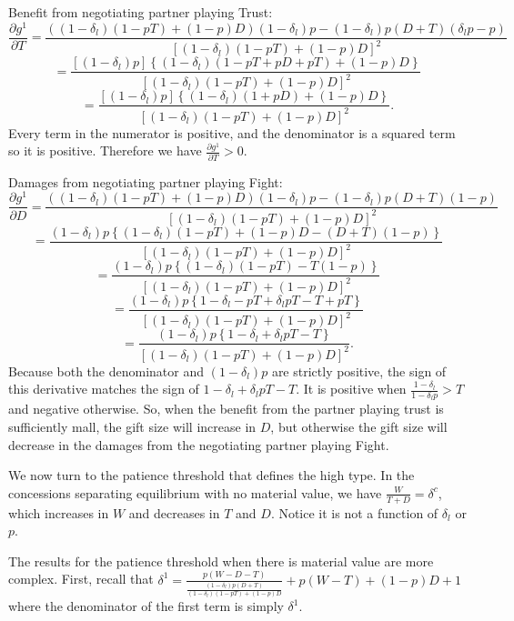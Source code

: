 \documentclass[12pt, letterpaper]{article}
\newcommand{\de}{\delta}
\begin{document}
{Benefit from negotiating partner playing Trust: 
$$\frac{\partial g^1}{\partial T} = \frac{\left(\left(1-\de_l\right)\left(1 - pT \right) + (1-p) D\right)(1-\de_l)p - \left(1-\de_l\right)p\left(D + T\right)(\de_l p -p)}{\left[\left(1-\de_l\right)\left(1 - pT \right) + (1-p) D\right]^2}$$
$$= \frac{\left[(1-\de_l)p\right] \left\{\left(1-\de_l\right)\left(1 - pT + pD + pT\right) + (1-p) D\right\}}{\left[\left(1-\de_l\right)\left(1 - pT \right) + (1-p) D\right]^2}$$
$$= \frac{\left[(1-\de_l)p\right] \left\{\left(1-\de_l\right)\left(1 + pD \right) + (1-p) D\right\}}{\left[\left(1-\de_l\right)\left(1 - pT \right) + (1-p) D\right]^2}.$$ Every term in the numerator is positive, and the denominator is a squared term so it is positive. Therefore we have $\frac{\partial g^1}{\partial T} > 0$.

Damages from negotiating partner playing Fight: $$\frac{\partial g^1}{\partial D} = \frac{\left(\left(1-\de_l\right)\left(1 - pT \right) + (1-p) D\right)(1-\de_l)p - \left(1-\de_l\right)p\left(D + T\right)(1 -p)}{\left[\left(1-\de_l\right)\left(1 - pT \right) + (1-p) D\right]^2}$$
$$= \frac{(1-\de_l)p\left\{\left(1-\de_l\right)\left(1 - pT \right) + (1-p) D - \left(D + T\right)(1 -p)\right\}}{\left[\left(1-\de_l\right)\left(1 - pT \right) + (1-p) D\right]^2}$$
$$= \frac{(1-\de_l)p\left\{\left(1-\de_l\right)\left(1 - pT \right) - T(1 -p)\right\}}{\left[\left(1-\de_l\right)\left(1 - pT \right) + (1-p) D\right]^2}$$
$$= \frac{(1-\de_l)p\left\{1-\de_l -pT + \de_l p T - T +pT\right\}}{\left[\left(1-\de_l\right)\left(1 - pT \right) + (1-p) D\right]^2}$$
$$= \frac{(1-\de_l)p\left\{1-\de_l + \de_l p T - T\right\}}{\left[\left(1-\de_l\right)\left(1 - pT \right) + (1-p) D\right]^2}.$$ Because both the denominator and $(1-\de_l)p$ are strictly positive, the sign of this derivative matches the sign of $1-\de_l + \de_l p T - T$. It is positive when $\frac{1-\de_l}{1-\de_l p} > T$ and negative otherwise. So, when the benefit from the partner playing trust is sufficiently mall, the gift size will increase in $D$, but otherwise the gift size will decrease in the damages from the negotiating partner playing Fight.


We now turn to the patience threshold that defines the high type. In the {concessions separating equilibrium} with no material value, we have $\frac{W}{T+D} = \de^{c}$, which increases in $W$ and decreases in $T$ and $D$. Notice it is not a function of $\delta_l$ or $p$.

The results for the patience threshold when there is material value are more complex. First, recall that $\de^1 = \frac{p(W-D-T)}{\frac{\left(1-\de_l\right)p\left(D +	 T\right)}{\left(1-\de_l\right)\left(1 - pT \right) + (1-p) D}} + p (W-T) + (1-p)D + 1$ where the denominator of the first term is simply $\delta^1$.

}
\end{document}
